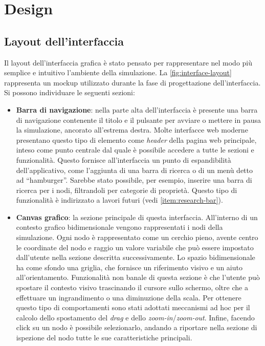 \chapter{Design}
\section{Layout dell'interfaccia} \label{section:interface-layout}
Il layout dell'interfaccia grafica è stato pensato per rappresentare nel modo più semplice e intuitivo l'ambiente della simulazione.  La \cref{fig:interface-layout} rappresenta un mockup utilizzato durante la fase di progettazione dell'interfaccia. Si possono individuare le seguenti sezioni:
\begin{itemize}
	\item \textbf{Barra di navigazione}: nella parte alta dell'interfaccia è presente una barra di navigazione contenente il titolo e il pulsante per avviare o mettere in pausa la simulazione, ancorato all'estrema destra. Molte interfacce web moderne presentano questo tipo di elemento come \textit{header} della pagina web principale, inteso come punto centrale dal quale è possibile accedere a tutte le sezioni e funzionalità. Questo fornisce all'interfaccia un punto di espandibilità dell'applicativo, come l'aggiunta di una barra di ricerca o di un menù detto ad ``hamburger''. Sarebbe stato possibile, per esempio, inserire una barra di ricerca per i nodi, filtrandoli per categorie di proprietà. Questo tipo di funzionalità è indirizzato a lavori futuri (vedi \cref{item:research-bar}). 
	\item \textbf{Canvas grafico}: la sezione principale di questa interfaccia. All'interno di un contesto grafico bidimensionale vengono rappresentati i nodi della simulazione. Ogni nodo è rappresentato come un cerchio pieno, avente centro le coordinate del nodo e raggio un valore variabile che può essere impostato dall'utente nella sezione descritta successivamente. Lo spazio bidimensionale ha come sfondo una griglia, che  fornisce un riferimento visivo e un aiuto all'orientamento. Funzionalità non banale di questa sezione è che l'utente può spostare il contesto visivo trascinando il cursore sullo schermo, oltre che a effettuare un ingrandimento o una diminuzione della scala. Per ottenere questo tipo di comportamenti sono stati adottati meccanismi ad hoc per il calcolo dello spostamento del \textit{drag} e dello \textit{zoom-in}/\textit{zoom-out}. Infine, facendo click su un nodo è possibile selezionarlo, andando a riportare nella sezione di ispezione del nodo tutte le sue caratteristiche principali.

\end{itemize}
